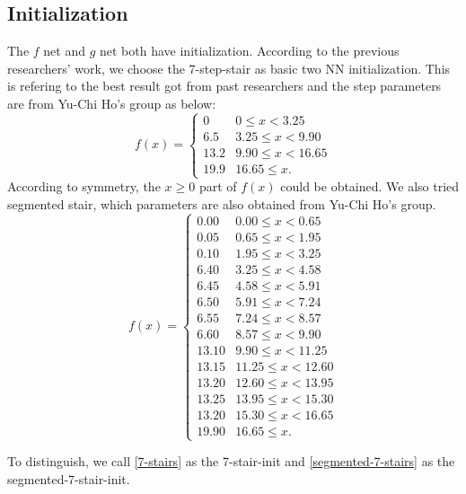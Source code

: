 \documentclass[conference,compsoc]{IEEEtran}
\begin{document}
\subsection{Initialization}
The $f$ net and $g$ net both have initialization. According to the previous researchers' work, we choose the 7-step-stair as basic two NN initialization. This is refering to the best result got from past researchers and the step parameters are from Yu-Chi Ho's group\cite{lee2001witsenhausen} as below:
\begin{equation}\label{7-stairs}
    f(x)=
    \begin{cases}
          0 & 0 \leq x < 3.25 \\
          6.5 & 3.25 \leq x < 9.90\\
          13.2 & 9.90 \leq x<16.65\\
          19.9 & 16.65 \leq x.
  \end{cases}
\end{equation}
According to symmetry, the $x \geq 0$ part of $f(x)$ could be obtained. We also tried segmented stair, which parameters are also obtained from Yu-Chi Ho's group\cite{lee2001witsenhausen}.
\begin{equation}\label{segmented-7-stairs}
  f(x)=
  \begin{cases}
        0.00 & 0.00 \leq x < 0.65\\
        0.05 & 0.65 \leq x < 1.95\\
        0.10 & 1.95 \leq x< 3.25\\
        6.40 & 3.25 \leq x< 4.58\\
        6.45 & 4.58 \leq x< 5.91\\
        6.50 & 5.91 \leq x< 7.24\\
        6.55 & 7.24 \leq x< 8.57\\
        6.60 & 8.57 \leq x< 9.90\\
        13.10 & 9.90 \leq x< 11.25\\
        13.15 & 11.25 \leq x< 12.60\\
        13.20 & 12.60 \leq x< 13.95\\
        13.25 & 13.95 \leq x< 15.30\\
        13.20 & 15.30 \leq x< 16.65\\
        19.90 & 16.65 \leq x.
\end{cases}
\end{equation}

To distinguish, we call \eqref{7-stairs} as the 7-stair-init and \eqref{segmented-7-stairs} as the segmented-7-stair-init.
\end{document}
